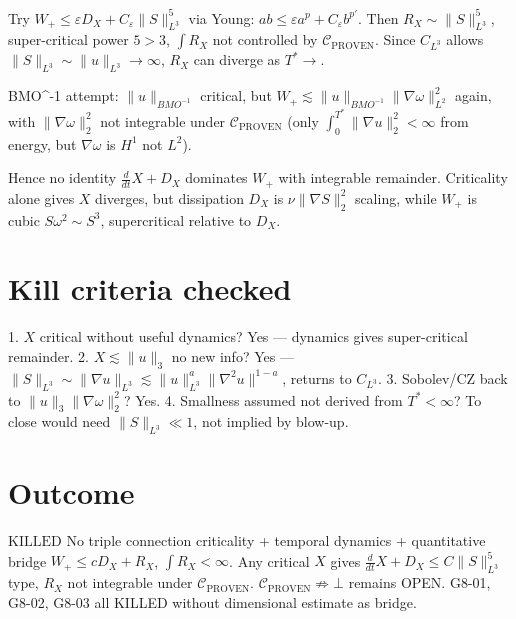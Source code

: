 \documentclass[11pt]{article}
\begin{document}
Try $W_+\le\varepsilon D_X+C_\varepsilon\|S\|_{L^3}^5$ via Young: $ab\le\varepsilon a^p+C_\varepsilon b^{p'}$.
Then $R_X\sim\|S\|_{L^3}^5$, super-critical power $5>3$, $\int R_X$ not controlled by $\mathcal C_{\mathrm{PROVEN}}$.
Since $C_{L^3}$ allows $\|S\|_{L^3}\sim\|u\|_{L^3}\to\infty$, $R_X$ can diverge as $T^*\to$.

BMO^{-1} attempt: $\|u\|_{BMO^{-1}}$ critical, but $W_+\lesssim\|u\|_{BMO^{-1}}\|\nabla\omega\|_{L^2}^2$ again, with $\|\nabla\omega\|_2^2$ not integrable under $\mathcal C_{\mathrm{PROVEN}}$ (only $\int_0^{T^*}\|\nabla u\|_2^2<\infty$ from energy, but $\nabla\omega$ is $H^1$ not $L^2$).

Hence no identity $\frac{d}{dt}X+D_X$ dominates $W_+$ with integrable remainder. Criticality alone gives $X$ diverges, but dissipation $D_X$ is $\nu\|\nabla S\|_2^2$ scaling, while $W_+$ is cubic $S\omega^2\sim S^3$, supercritical relative to $D_X$.

\section{Kill criteria checked}
1. $X$ critical without useful dynamics? Yes — dynamics gives super-critical remainder.
2. $X\lesssim\|u\|_3$ no new info? Yes — $\|S\|_{L^3}\sim\|\nabla u\|_{L^3}\lesssim\|u\|_{L^3}^{a}\|\nabla^2u\|^{1-a}$, returns to $C_{L^3}$.
3. Sobolev/CZ back to $\|u\|_3\|\nabla\omega\|_2^2$? Yes.
4. Smallness assumed not derived from $T^*<\infty$? To close would need $\|S\|_{L^3}\ll1$, not implied by blow-up.

\section{Outcome}
$\boxed{\mathrm{KILLED}}$
No triple connection criticality + temporal dynamics + quantitative bridge $W_+\le cD_X+R_X$, $\int R_X<\infty$.
Any critical $X$ gives $\frac{d}{dt}X+D_X\le C\|S\|_{L^3}^5$ type, $R_X$ not integrable under $\mathcal C_{\mathrm{PROVEN}}$.
$\mathcal C_{\mathrm{PROVEN}}\not\Rightarrow\bot$ remains OPEN. G8-01, G8-02, G8-03 all KILLED without dimensional estimate as bridge.
\end{document}
